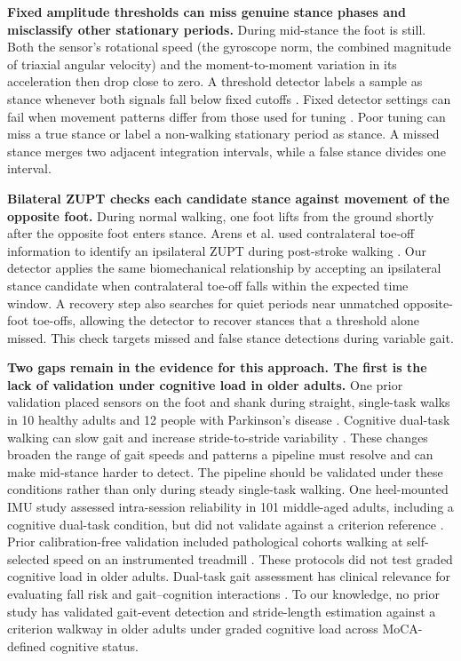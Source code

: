 \documentclass[11pt]{article}
\begin{document}
\textbf{Fixed amplitude thresholds can miss genuine stance phases and misclassify other stationary periods.}
During mid-stance the foot is still. Both the sensor's rotational speed (the gyroscope norm, the combined magnitude of triaxial angular velocity) and the moment-to-moment variation in its acceleration then drop close to zero. A threshold detector labels a sample as stance whenever both signals fall below fixed cutoffs \citep{Skog2010}. Fixed detector settings can fail when movement patterns differ from those used for tuning \citep{Foxlin2005}. Poor tuning can miss a true stance or label a non-walking stationary period as stance. A missed stance merges two adjacent integration intervals, while a false stance divides one interval.

\textbf{Bilateral ZUPT checks each candidate stance against movement of the opposite foot.}
During normal walking, one foot lifts from the ground shortly after the opposite foot enters stance. Arens et al. used contralateral toe-off information to identify an ipsilateral ZUPT during post-stroke walking \citep{Arens2021}. Our detector applies the same biomechanical relationship by accepting an ipsilateral stance candidate when contralateral toe-off falls within the expected time window. A recovery step also searches for quiet periods near unmatched opposite-foot toe-offs, allowing the detector to recover stances that a threshold alone missed. This check targets missed and false stance detections during variable gait.

\textbf{Two gaps remain in the evidence for this approach. The first is the lack of validation under cognitive load in older adults.}
One prior validation placed sensors on the foot and shank during straight, single-task walks in 10 healthy adults and 12 people with Parkinson's disease \citep{Sijobert2015}. Cognitive dual-task walking can slow gait and increase stride-to-stride variability \citep{Beauchet2005, Yogev-Seligmann2008, Hausdorff2008}. These changes broaden the range of gait speeds and patterns a pipeline must resolve and can make mid-stance harder to detect. The pipeline should be validated under these conditions rather than only during steady single-task walking. One heel-mounted IMU study assessed intra-session reliability in 101 middle-aged adults, including a cognitive dual-task condition, but did not validate against a criterion reference \citep{Boutaayamou2025}. Prior calibration-free validation included pathological cohorts walking at self-selected speed on an instrumented treadmill \citep{Laidig2021}. These protocols did not test graded cognitive load in older adults. Dual-task gait assessment has clinical relevance for evaluating fall risk and gait--cognition interactions \citep{Montero-Odasso2012, Commandeur2018, Springer2006}. To our knowledge, no prior study has validated gait-event detection and stride-length estimation against a criterion walkway in older adults under graded cognitive load across MoCA-defined cognitive status.
\end{document}
